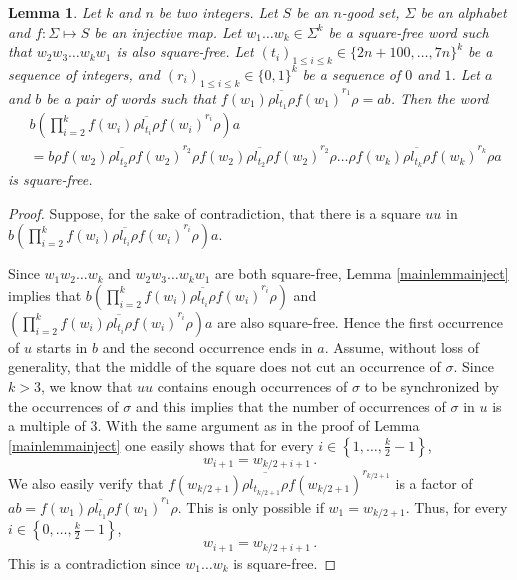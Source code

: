 \documentclass[a4paper,12pt]{article}
\newtheorem{lemma}{Lemma}
\newcommand{\pal}{\rho}
\newcommand{\hpal}{\sigma}
\begin{document}
\begin{lemma}\label{mainlemmainjectbis}
Let $k$ and $n$ be two integers. Let $S$ be an $n$-good set, $\Sigma$ be an alphabet and $f:\Sigma\mapsto S$ be an injective map.
Let  $w_1\ldots w_k\in \Sigma^k$ be a square-free word such that $w_2w_3\ldots w_kw_1$ is also square-free. Let $(t_i)_{1\le i\le k}\in \{2n+100,\ldots, 7n\}^k$ be a sequence of integers, and  $(r_i)_{1\le i\le k}\in \{0,1\}^k$ be a sequence of $0$ and $1$.
Let  $a$ and $b$ be a pair of words such that $\overline {f(w_1)\pal l_{t_1}\pal f(w_1)}^{r_1}\pal = ab$. Then the word
\begin{align*}
&b\left(\prod_{i=2}^k \overline {f(w_i)\pal l_{t_i}\pal f(w_i)}^{r_i}\pal \right) a\\
&=
b \pal \overline {f(w_2)\pal l_{t_2}\pal f(w_2)}^{r_2}\pal 
\overline {f(w_2)\pal l_{t_2}\pal f(w_2)}^{r_2}\pal 
\ldots 
\pal \overline {f(w_k)\pal l_{t_k}\pal f(w_k)}^{r_k}\pal  a
\end{align*}
is square-free.
\end{lemma}
\begin{proof}
  Suppose, for the sake of contradiction, that there is a square $uu$ in $b\left(\prod_{i=2}^k \overline {f(w_i)\pal l_{t_i}\pal f(w_i)}^{r_i}\pal \right) a$.
  
  Since $w_1w_2\ldots w_k$ and  $w_2w_3\ldots w_kw_1$ are both square-free, Lemma \ref{mainlemmainject} implies that
  $b\left(\prod_{i=2}^k \overline {f(w_i)\pal l_{t_i}\pal f(w_i)}^{r_i}\pal \right)$ and $\left(\prod_{i=2}^k \overline {f(w_i)\pal l_{t_i}\pal f(w_i)}^{r_i}\pal \right)a$ are also square-free. Hence the first occurrence of $u$ starts in $b$ and the second occurrence ends in $a$. Assume, without loss of generality, that the middle of the square does not cut an occurrence of $\hpal $.
  Since $k>3$, we know that $uu$ contains enough occurrences of $\hpal $ to be synchronized by the occurrences of $\hpal $ and this implies that the number of occurrences of $\hpal $ in $u$ is a multiple of $3$. With the same argument as in the proof of Lemma \ref{mainlemmainject} one easily shows that for every $i\in\left\{1,\ldots,\frac{k}{2}-1\right\}$,
  $$w_{i+1}= w_{k/2+i+1}\,.$$
  We also easily verify that  $\overline{f(w_{k/2+1})\pal l_{t_{k/2+1}}\pal f(w_{k/2+1})}^{r_{k/2+1}}$ is a factor of $ab=\overline {f(w_1)\pal l_{t_1}\pal f(w_1)}^{r_1}\pal $. This is only possible if $w_1 = w_{k/2+1}$. Thus, for every $i\in\left\{0,\ldots,\frac{k}{2}-1\right\}$,
  $$w_{i+1}= w_{k/2+i+1}\,.$$
  This is a contradiction since $w_1\ldots w_k$ is square-free.  
\end{proof}
\end{document}
